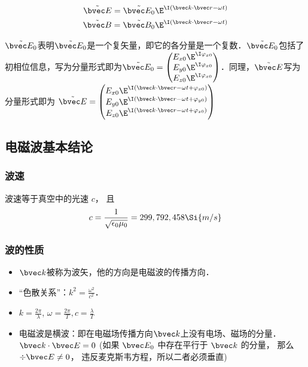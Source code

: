 \begin{align}
\tilde {\bvec E} = \tilde {\bvec E_0} \E^{\I(\bvec k \cdot \bvec r - \omega t)}\\
\tilde {\bvec B} = \tilde {\bvec B_0} \E^{\I(\bvec k \cdot \bvec r - \omega t)}\\
\end{align}

$\tilde {\bvec E_0}$表明$\tilde {\bvec E_0}$是一个复矢量，即它的各分量是一个复数．$\tilde {\bvec E_0}$包括了初相位信息，写为分量形式即为$
\tilde {\bvec E_0} = 
\begin{pmatrix}
E_{x0} \E^{\I\varphi_{x0}}\\
E_{y0} \E^{\I\varphi_{x0}}\\
E_{z0} \E^{\I\varphi_{x0}}\\
\end{pmatrix}
$．同理，$\tilde {\bvec E}$写为分量形式即为 
$\tilde {\bvec E} = 
\begin{pmatrix}
E_{x0} \E^{\I(\bvec k \cdot \bvec r - \omega t + \varphi_{x0})}\\
E_{y0} \E^{\I(\bvec k \cdot \bvec r - \omega t + \varphi_{y0})}\\
E_{z0} \E^{\I(\bvec k \cdot \bvec r - \omega t + \varphi_{z0})}\\
\end{pmatrix}
$

\subsection{电磁波基本结论}
\subsubsection{波速}
波速等于真空中的光速 $c$， 且
\begin{equation}\label{VcPlWv_eq1}
c = \frac{1}{\sqrt{\epsilon_0\mu_0}} = 299,792,458 \Si{m/s}
\end{equation}

\subsubsection{波的性质}
\begin{itemize}
\item $\bvec k$被称为波矢，他的方向是电磁波的传播方向．
\item  “色散关系”：$k^2=\frac{\omega^2}{c^2}$．
\item $k=\frac{2\pi}{\lambda}$, $\omega=\frac{2\pi}{T}, c=\frac{\lambda}{T}$
\item 电磁波是横波：即在电磁场传播方向$\bvec k$上没有电场、磁场的分量．$\bvec k \cdot \bvec E = 0$ (如果 $\bvec E_0$ 中存在平行于 $\bvec k$ 的分量， 那么 $\div \bvec E \ne 0$， 违反麦克斯韦方程，所以二者必须垂直)
\end{itemize}

